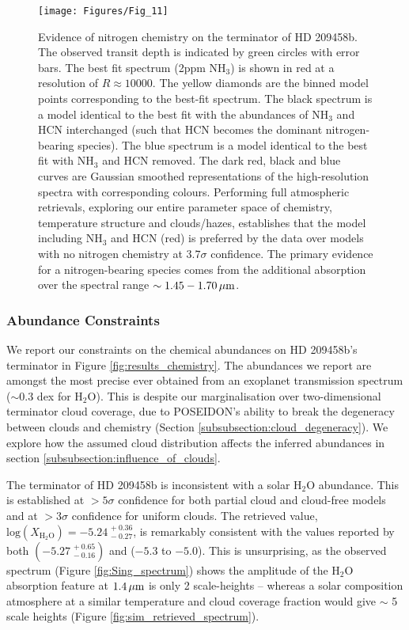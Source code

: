 \documentclass[fleqn,usenatbib]{mnras}
\begin{document}
\begin{figure*}
	\texttt{[image: Figures/Fig\_11]}
    \caption{Evidence of nitrogen chemistry on the terminator of HD 209458b. The observed transit depth is indicated by green circles with error bars. The best fit spectrum (2ppm $\mathrm{NH_3}$) is shown in red at a resolution of $R \approx 10000$. The yellow diamonds are the binned model points corresponding to the best-fit spectrum. The black spectrum is a model identical to the best fit with the abundances of $\mathrm{NH_3}$ and $\mathrm{HCN}$ interchanged (such that $\mathrm{HCN}$ becomes the dominant nitrogen-bearing species). The blue spectrum is a model identical to the best fit with $\mathrm{NH_3}$ and $\mathrm{HCN}$ removed. The dark red, black and blue curves are Gaussian smoothed representations of the high-resolution spectra with corresponding colours. Performing full atmospheric retrievals, exploring our entire parameter space of chemistry, temperature structure and clouds/hazes, establishes that the model including $\mathrm{NH_3}$ and $\mathrm{HCN}$ (red) is preferred by the data over models with no nitrogen chemistry at $3.7\sigma$ confidence. The primary evidence for a nitrogen-bearing species comes from the additional absorption over the spectral range $\sim 1.45-1.70 \,\hbox{$\mu$m}$.}
    \label{fig:nitrogen_chemistry}
\end{figure*}

\subsubsection{Abundance Constraints}\label{subsubsection:results_abundance}

We report our constraints on the chemical abundances on HD 209458b's terminator in Figure \ref{fig:results_chemistry}. The abundances we report are amongst the most precise ever obtained from an exoplanet transmission spectrum ($\sim 0.3$ dex for $\mathrm{H_{2}O}$). This is despite our marginalisation over two-dimensional terminator cloud coverage, due to POSEIDON's ability to break the degeneracy between clouds and chemistry (Section \ref{subsubsection:cloud_degeneracy}). We explore how the assumed cloud distribution affects the inferred abundances in section \ref{subsubsection:influence_of_clouds}.

The terminator of HD 209458b is inconsistent with a solar $\mathrm{H_{2}O}$ abundance. This is established at $>5\sigma$ confidence for both partial cloud and cloud-free models and at $>3\sigma$ confidence for uniform clouds. The retrieved value, $\mathrm{log}(X_{\mathrm{H_{2}O}}) = -5.24^{\, +0.36}_{\, -0.27}$, is remarkably consistent with the values reported by both \citet{Madhusudhan2014c} $\left(-5.27^{\, +0.65}_{\, -0.16}\right)$ and \citet{Barstow2016} ($-5.3$ to $-5.0$). This is unsurprising, as the observed spectrum (Figure \ref{fig:Sing_spectrum}) shows the amplitude of the H$_2$O absorption feature at $1.4 \, \hbox{$\mu$m}$ is only 2 scale-heights -- whereas a solar composition atmosphere at a similar temperature and cloud coverage fraction would give $\sim$ 5 scale heights (Figure \ref{fig:sim_retrieved_spectrum}).
\end{document}
